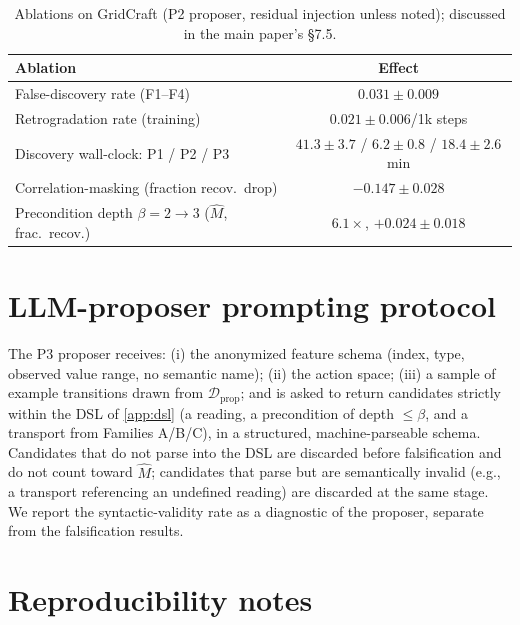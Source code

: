 \documentclass[11pt]{article}
\theoremstyle{plain}
\theoremstyle{definition}
\theoremstyle{remark}
\begin{document}
\begin{table}[h]
\centering\small
\caption{Ablations on GridCraft (P2 proposer, residual injection unless noted); discussed in the main paper's \S7.5.}
\label{tab:ablations}
\begin{tabular}{@{}lc@{}}
\toprule
Ablation & Effect \\
\midrule
False-discovery rate (F1--F4) & $0.031\pm0.009$ \\
Retrogradation rate (training) & $0.021\pm0.006$/1k steps \\
Discovery wall-clock: P1 / P2 / P3 & $41.3{\pm}3.7$ / $6.2{\pm}0.8$ / $18.4{\pm}2.6$ min \\
Correlation-masking (fraction recov.\ drop) & $-0.147\pm0.028$ \\
Precondition depth $\beta{=}2{\to}3$ ($\hat M$, frac.\ recov.) & $6.1\times$, $+0.024\pm0.018$ \\
\bottomrule
\end{tabular}
\end{table}

\section{LLM-proposer prompting protocol}
\label{app:llm}

The P3 proposer receives: (i) the anonymized feature schema (index, type, observed value range, no semantic name); (ii) the action space; (iii) a sample of example transitions drawn from $\mathcal{D}_{\mathrm{prop}}$; and is asked to return candidates strictly within the DSL of \autoref{app:dsl} (a reading, a precondition of depth $\le\beta$, and a transport from Families A/B/C), in a structured, machine-parseable schema. Candidates that do not parse into the DSL are discarded before falsification and do not count toward $\hat M$; candidates that parse but are semantically invalid (e.g., a transport referencing an undefined reading) are discarded at the same stage. We report the syntactic-validity rate as a diagnostic of the proposer, separate from the falsification results.

\section{Reproducibility notes}
\label{app:repro}
\end{document}

